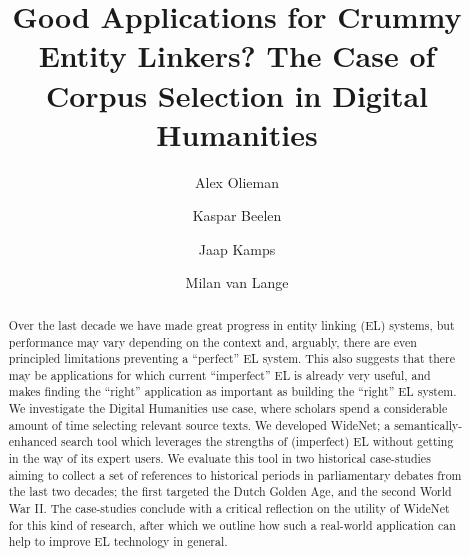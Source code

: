 \documentclass[runningheads,a4paper]{llncs}
\begin{document}
\mainmatter

\title{Good Applications for Crummy Entity Linkers? The Case of Corpus Selection in Digital Humanities}
\author{Alex Olieman \and
Kaspar Beelen \and
Jaap Kamps \and
Milan van Lange}
\maketitle

\begin{abstract}
Over the last decade we have made great progress in entity linking (EL) systems, but performance may vary depending on the context and, arguably, there are even principled limitations preventing a ``perfect'' EL system. This also suggests that there may be applications for which current ``imperfect'' EL is already very useful, and makes finding the ``right'' application as important as building the ``right'' EL system. We investigate the Digital Humanities use case, where scholars spend a considerable amount of time selecting relevant source texts. We developed WideNet; a semantically-enhanced search tool which leverages the strengths of (imperfect) EL without getting in the way of its expert users. We evaluate this tool in two historical case-studies aiming to collect a set of references to historical periods in parliamentary debates from the last two decades; the first targeted the Dutch Golden Age, and the second World War II. The case-studies conclude with a critical reflection on the utility of WideNet for this kind of research, after which we outline how such a real-world application can help to improve EL technology in general.

\end{abstract}
\end{document}

